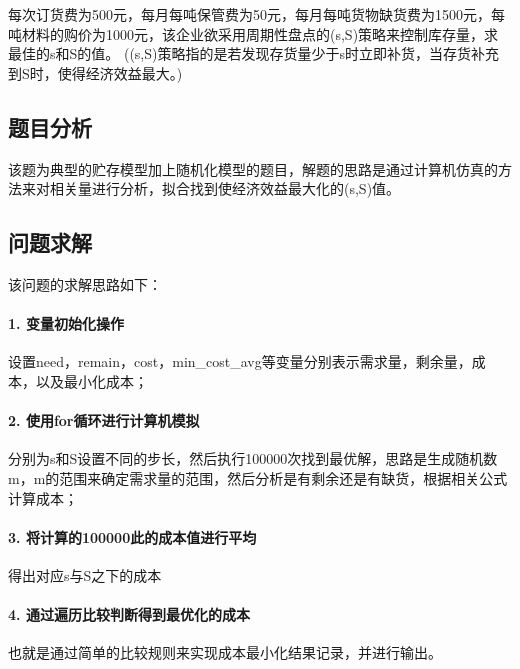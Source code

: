\documentclass[UTF8]{ctexart}
\begin{document}
    每次订货费为500元，每月每吨保管费为50元，每月每吨货物缺货费为1500元，每吨材料的购价为1000元，该企业欲采用周期性盘点的(s,S)策略来控制库存量，求最佳的s和S的值。
    ((s,S)策略指的是若发现存货量少于s时立即补货，当存货补充到S时，使得经济效益最大。)

    \subsection{题目分析}
    该题为典型的贮存模型加上随机化模型的题目，解题的思路是通过计算机仿真的方法来对相关量进行分析，拟合找到使经济效益最大化的(s,S)值。
    \subsection{问题求解}
    该问题的求解思路如下：
    \paragraph{1. 变量初始化操作}
    设置need，remain，cost，min\_cost\_avg等变量分别表示需求量，剩余量，成本，以及最小化成本；

    \paragraph{2. 使用for循环进行计算机模拟}
    分别为s和S设置不同的步长，然后执行100000次找到最优解，思路是生成随机数m，m的范围来确定需求量的范围，然后分析是有剩余还是有缺货，根据相关公式计算成本；

    \paragraph{3. 将计算的100000此的成本值进行平均} 得出对应s与S之下的成本

    \paragraph{4. 通过遍历比较判断得到最优化的成本} 也就是通过简单的比较规则来实现成本最小化结果记录，并进行输出。
\end{document}
